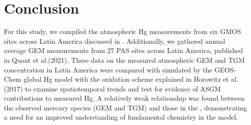 \section{Conclusion}\label{c2_conclusion}

\begin{flushleft}
For this study, we compiled the atmospheric Hg measurements from six GMOS sites across Latin America discussed in \cite{koenig_seasonal_2021,sprovieri_atmospheric_2016}. Additionally, we gathered annual average GEM measurements from 27 PAS sites across Latin America, published in Quant et al.(2021). These data on the measured atmospheric GEM and TGM concentration in Latin America were compared with \hgc simulated by the GEOS-Chem global Hg model with the oxidation scheme explained in Horowitz et al. (2017) to examine spatiotemporal trends and test for evidence of ASGM contributions to measured Hg. A relatively weak relationship was found between the observed mercury species (GEM and TGM) and those in the \on, demonstrating a need for an improved understanding of fundamental chemistry in the \gc model.

\end{flushleft}